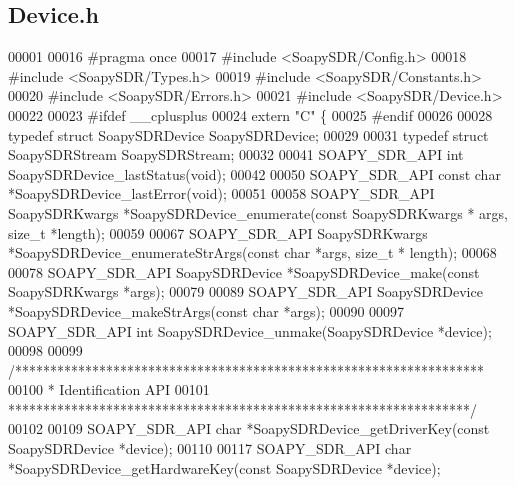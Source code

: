 \subsection{Device.\+h}
\label{Device_8h_source}

\begin{DoxyCode}
00001 
00016 \textcolor{preprocessor}{#pragma once}
00017 \textcolor{preprocessor}{#include <SoapySDR/Config.h>}
00018 \textcolor{preprocessor}{#include <SoapySDR/Types.h>}
00019 \textcolor{preprocessor}{#include <SoapySDR/Constants.h>}
00020 \textcolor{preprocessor}{#include <SoapySDR/Errors.h>}
00021 \textcolor{preprocessor}{#include <SoapySDR/Device.h>}
00022 
00023 \textcolor{preprocessor}{#ifdef \_\_cplusplus}
00024 \textcolor{keyword}{extern} \textcolor{stringliteral}{"C"} \{
00025 \textcolor{preprocessor}{#endif}
00026 
00028 \textcolor{keyword}{typedef} \textcolor{keyword}{struct }SoapySDRDevice SoapySDRDevice;
00029 
00031 \textcolor{keyword}{typedef} \textcolor{keyword}{struct }SoapySDRStream SoapySDRStream;
00032 
00041 SOAPY_SDR_API \textcolor{keywordtype}{int} SoapySDRDevice_lastStatus(\textcolor{keywordtype}{void});
00042 
00050 SOAPY_SDR_API \textcolor{keyword}{const} \textcolor{keywordtype}{char} *SoapySDRDevice_lastError(\textcolor{keywordtype}{void});
00051 
00058 SOAPY_SDR_API SoapySDRKwargs *SoapySDRDevice_enumerate(\textcolor{keyword}{const} SoapySDRKwargs *
      args, \textcolor{keywordtype}{size\_t} *length);
00059 
00067 SOAPY_SDR_API SoapySDRKwargs *SoapySDRDevice_enumerateStrArgs(\textcolor{keyword}{const} \textcolor{keywordtype}{char} *args, \textcolor{keywordtype}{size\_t} *
      length);
00068 
00078 SOAPY_SDR_API SoapySDRDevice *SoapySDRDevice_make(\textcolor{keyword}{const} SoapySDRKwargs *args);
00079 
00089 SOAPY_SDR_API SoapySDRDevice *SoapySDRDevice_makeStrArgs(\textcolor{keyword}{const} \textcolor{keywordtype}{char} *args);
00090 
00097 SOAPY_SDR_API \textcolor{keywordtype}{int} SoapySDRDevice_unmake(SoapySDRDevice *device);
00098 
00099 \textcolor{comment}{/*******************************************************************}
00100 \textcolor{comment}{ * Identification API}
00101 \textcolor{comment}{ ******************************************************************/}
00102 
00109 SOAPY_SDR_API \textcolor{keywordtype}{char} *SoapySDRDevice_getDriverKey(\textcolor{keyword}{const} SoapySDRDevice *device);
00110 
00117 SOAPY_SDR_API \textcolor{keywordtype}{char} *SoapySDRDevice_getHardwareKey(\textcolor{keyword}{const} SoapySDRDevice *device);

\end{DoxyCode}
